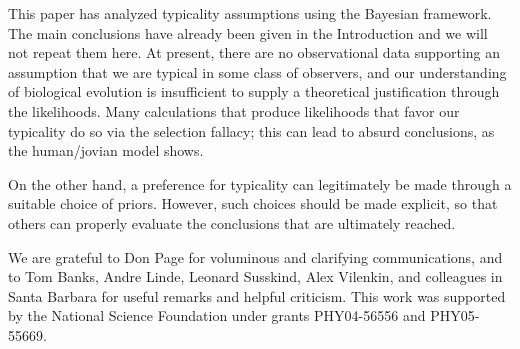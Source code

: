 \documentclass[pra,floatfix,preprint,nofootinbib,12pt]{revtex4}
\begin{document}
This paper has analyzed typicality assumptions using the Bayesian framework. The main conclusions have already been given in the Introduction and we will not repeat them here.  At present, there are no observational data supporting an assumption that we are typical in some class of observers, and our understanding of biological evolution is insufficient to supply a theoretical justification through the likelihoods. Many calculations that produce likelihoods that favor our typicality do so via the selection fallacy; this can lead to absurd conclusions, as the human/jovian model shows.  

On the other hand, a preference for typicality can legitimately be made through a suitable choice of priors. However, such choices should be made explicit, so that others can properly evaluate the conclusions that are ultimately reached. 

\begin{acknowledgments}

We are grateful to Don Page for voluminous and clarifying communications, and to 
Tom Banks, Andre Linde, Leonard Susskind, Alex Vilenkin, and colleagues in Santa Barbara  for useful remarks and helpful criticism.   
This work was supported
by the National Science Foundation under grants PHY04-56556 and PHY05-55669.

\end{acknowledgments}
\end{document}
